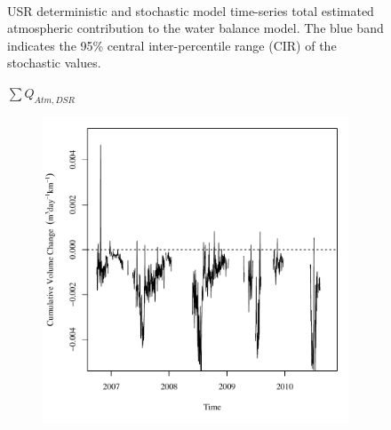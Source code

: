 \begin{landscape}
\begin{figure}
\begin{subfigure}{0.7\textwidth}
		\end{subfigure}\\
		\caption[USR deterministic and stochastic model time-series total estimated atmospheric contribution to the water balance model.]{USR deterministic and stochastic model time-series total estimated atmospheric contribution to the water balance model.  The blue band indicates the 95\% central inter-percentile range (CIR) of the stochastic values.}
		\label{fig:reachAtm_US}
	\end{figure}
\end{landscape}
\subfiguretop
\begin{landscape}
	\begin{figure}
		\centering
		$ \displaystyle \sum Q_{Atm,DSR} $
		\begin{subfigure}{0.7\textwidth}
			\centering
			\includegraphics[width=\tableCustomSize]{"Figures/Results_DSR/Deterministic/Balance Water - atm"}
		\end{subfigure}%
		\begin{subfigure}{0.7\textwidth}
			\centering

\end{subfigure}
\end{figure}
\end{landscape}
